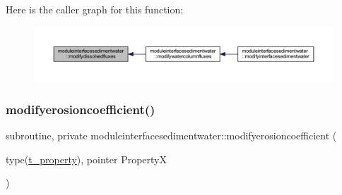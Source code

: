 Here is the caller graph for this function\+:\nopagebreak
\begin{figure}[H]
\begin{center}
\leavevmode
\includegraphics[width=350pt]{namespacemoduleinterfacesedimentwater_ac7453c783a3170a319fb2e8f0bc6af3b_icgraph}
\end{center}
\end{figure}
\mbox{\label{namespacemoduleinterfacesedimentwater_aae597d2dbf7b3014156d4fb4815b25bb}} 
\subsubsection{\texorpdfstring{modifyerosioncoefficient()}{modifyerosioncoefficient()}}
{\footnotesize\ttfamily subroutine, private moduleinterfacesedimentwater\+::modifyerosioncoefficient (\begin{DoxyParamCaption}\item[{type(\mbox{\hyperlink{structmoduleinterfacesedimentwater_1_1t__property}{t\+\_\+property}}), pointer}]{PropertyX }\end{DoxyParamCaption})\hspace{0.3cm}{\ttfamily [private]}}

